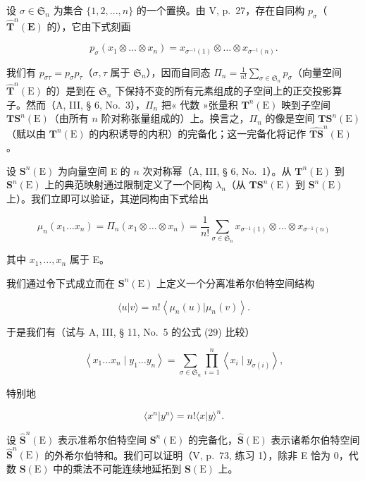 设 \(\sigma \in \mathfrak{S}_n\) 为集合 \(\{1, 2, ..., n\}\) 的一个置换。由 V, p.~27，存在自同构 \(p_{\sigma}\)（\(\hat{\mathbf{T}}^n(\mathbf{E})\) 的），它由下式刻画

\[
p _ {\sigma} (x _ {1} \otimes \dots \otimes x _ {n}) = x _ {\sigma^ {- 1} (1)} \otimes \dots \otimes x _ {\sigma^ {- 1} (n)}.
\]

我们有 \(p_{\sigma \tau} = p_{\sigma}p_{\tau}\)（\(\sigma, \tau\) 属于 \(\mathfrak{S}_n\)），因而自同态 \(\Pi_n = \frac{1}{n!}\sum_{\sigma \in \mathfrak{S}_n}p_\sigma\)（向量空间 \(\hat{\mathbf{T}}^n (\mathrm{E})\) 的）是到在 \(\mathfrak{S}_n\) 下保持不变的所有元素组成的子空间上的正交投影算子。然而（A, III, § 6, No.~3），\(\Pi_n\) 把« 代数 »张量积 \(\mathbf{T}^n (\mathrm{E})\) 映到子空间 \(\mathbf{T}\mathbf{S}^n (\mathrm{E})\)（由所有 \(n\) 阶对称张量组成的）上。换言之，\(\Pi_n\) 的像是空间 \(\mathbf{T}\mathbf{S}^n (\mathrm{E})\)（赋以由 \(\mathbf{T}^n (\mathrm{E})\) 的内积诱导的内积）的完备化；这一完备化将记作 \(\widehat{\mathbf{T}\mathbf{S}}^n (\mathrm{E})\)。

设 \(\mathbf{S}^n (\mathrm{E})\) 为向量空间 E 的 \(n\) 次对称幂（A, III, § 6, No.~1）。从 \(\mathbf{T}^n (\mathrm{E})\) 到 \(\mathbf{S}^n (\mathrm{E})\) 上的典范映射通过限制定义了一个同构 \(\lambda_{n}\)（从 \(\mathbf{TS}^n (\mathrm{E})\) 到 \(\mathbf{S}^n (\mathrm{E})\) 上）。我们立即可以验证，其逆同构由下式给出

\[
\mu_ {n} (x _ {1} \dots x _ {n}) = \Pi_ {n} (x _ {1} \otimes \dots \otimes x _ {n}) = \frac {1}{n !} \sum_ {\sigma \in \mathfrak {S} _ {n}} x _ {\sigma^ {- 1} (1)} \otimes \dots \otimes x _ {\sigma^ {- 1} (n)}\tag{13}
\]

其中 \(x_{1},\ldots ,x_{n}\) 属于 E。

我们通过令下式成立而在 \(\mathbf{S}^{n}(\mathrm{E})\) 上定义一个分离准希尔伯特空间结构

\[
\langle u | v \rangle = n! \left\langle \mu_ {n} (u) | \mu_ {n} (v) \right\rangle .\tag{14}
\]

于是我们有（试与 A, III, § 11, No.~5 的公式 (29) 比较）

\[
\left\langle x _ {1} \dots x _ {n} \mid y _ {1} \dots y _ {n} \right\rangle = \sum_ {\sigma \in \mathfrak {S} _ {n}} \prod_ {i = 1} ^ {n} \left\langle x _ {i} \mid y _ {\sigma (i)} \right\rangle ,\tag{15}
\]

特别地

\[
\langle x ^ {n} | y ^ {n} \rangle = n! \langle x | y \rangle^ {n}.\tag{16}
\]

设 \(\hat{\mathbf{S}}^n (\mathrm{E})\) 表示准希尔伯特空间 \(\mathbf{S}^n (\mathrm{E})\) 的完备化，\(\hat{\mathbf{S}} (\mathrm{E})\) 表示诸希尔伯特空间 \(\hat{\mathbf{S}}^n (\mathrm{E})\) 的外希尔伯特和。我们可以证明（V, p.~73, 练习 1），除非 E 恰为 0，代数 \(\mathbf{S}(\mathrm{E})\) 中的乘法不可能连续地延拓到 \(\mathbf{S}(\mathrm{E})\) 上。

